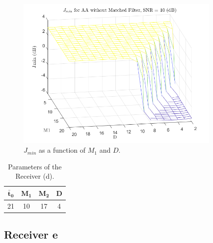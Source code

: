 \documentclass[a4paper, 12pt]{report}
\begin{document}
\begin{figure}[H]
	\centering
	\includegraphics[width=10cm]{images/optimal_params_AntiAliasingNoMF}
	\caption{$J_{min}$ as a function of $M_1$ and $D$.}\label{j_min_aa_nomf}
\end{figure}

\begin{table}[H]
	\centering
	\begin{tabular}{c c c c}
		\toprule
		$\mathbf{\bar{t}_0}$ & $\mathbf{M_1}$ & $\mathbf{M_2}$ & \textbf{D}     \\
		\midrule
		21 & 10 & 17 & 4 \\
		\bottomrule			
	\end{tabular}
	\caption{Parameters of the Receiver (d).}
	\label{Tab_d}
\end{table}

\clearpage
\subsection*{Receiver e}
\end{document}

